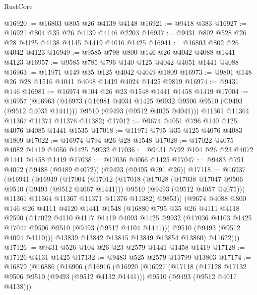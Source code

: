 \begin{lexlean}{RustCore}
\begin{coremodule}
@16920 := @16803 @805 @26 @4139 @4148
@16921 := @9418 @383
@16927 := @16921 @804 @35 @26 @4139 @4146 @2203
@16937 := @9431 @802 @528 @26 @28 @4125 @4138 @4145 @1419 @4016 @1425
@16941 := @16803 @802 @26 @4042 @4123
@16949 := @9585 @798 @800 @146 @26 @4042 @4088 @1441 @4123
@16957 := @9585 @785 @796 @140 @125 @4042 @4051 @1441 @4088
@16963 := @11971 @149 @35 @125 @4042 @4049 @1809
@16973 := @9801 @148 @26 @28 @1516 @4041 @4048 @1419 @4024 @1425 @9819
@16974 := @9431 @146
@16981 := @16974 @104 @26 @23 @1548 @1441 @1458 @1419
@17004 := @16957
    (@16963
      (@16973
        (@16981 @4034 @1425 @9932 @9506 @9510 (@9493 (@9512 @4035 @1441)))
        @9510
        (@9493 (@9512 @4025 @4041)))
      @11361
      @11364
      @11367
      @11371
      @11376
      @11382)
@17012 := @9674 @4051 @796 @140 @125 @4076 @4085 @1441 @1535
@17018 := @11971 @795 @35 @125 @4076 @4083 @1809
@17022 := @16974 @794 @26 @28 @1548
@17028 := @17022 @4075 @4082 @1419 @4056 @1425 @9932
@17036 := @9431 @792 @104 @26 @23 @4072 @1441 @1458 @1419
@17038 := @17036 @4066 @1425
@17047 := @9483 @791 @4072 (@9488 (@9489 @4072)) (@9493 (@9495 @791 @26))
@17118 := @16937
    (@16941
      (@16949
        (@17004
          (@17012
            (@17018
              (@17028
                (@17038 @17047 @9506 @9510 (@9493 (@9512 @4067 @1441)))
                @9510
                (@9493 (@9512 @4057 @4075)))
              @11361
              @11364
              @11367
              @11371
              @11376
              @11382)
            @9853))
        (@9674
          @4088
          @800
          @146
          @26
          @4111
          @4120
          @1441
          @1548
          (@16880
            @795
            @35
            @26
            @4111
            @4118
            @2590
            (@17022
              @4110
              @4117
              @1419
              @4093
              @1425
              @9932
              (@17036 @4103 @1425 @17047 @9506 @9510 (@9493 (@9512 @4104 @1441)))
              @9510
              (@9493 (@9512 @4094 @4110)))
            @13839
            @13842
            @13845
            @13849
            @13854
            @13860)
          @11622)))
@17126 := @9431 @526 @104 @26 @23 @2579 @1441 @1458 @1419
@17128 := @17126 @4131 @1425
@17132 := @9483 @525 @2579 @13799 @13803
@17174 := @16879
    (@16886
      (@16906
        (@16916
          (@16920
            (@16927
              (@17118
                (@17128 @17132 @9506 @9510 (@9493 (@9512 @4132 @1441)))
                @9510
                (@9493 (@9512 @4017 @4138)))

\end{coremodule}
\end{lexlean}
